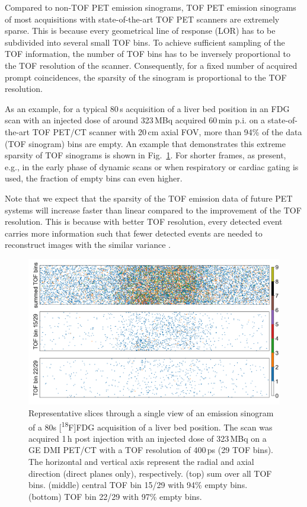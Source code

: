 Compared to non-TOF PET emission sinograms, TOF PET emission sinograms of most acquisitions
with state-of-the-art TOF PET scanners are extremely sparse.
This is because every geometrical line of response (LOR) has to be subdivided into
several small TOF bins.
To achieve sufficient sampling of the TOF information, the number of TOF bins has to be
inversely proportional to the TOF resolution of the scanner. 
Consequently, for a fixed number of acquired prompt coincidences, the sparsity of the
sinogram is proportional to the TOF resolution.

As an example, for a typical 80\,s acquisition of a liver bed position in an FDG scan with 
an injected dose of around 323\,MBq acquired 60\,min p.i. on a state-of-the-art TOF PET/CT scanner with
20\,cm axial FOV, more than 94\% of the data (TOF sinogram) bins are empty.
An example that demonstrates this extreme sparsity of TOF sinograms is shown in Fig.~\ref{fig:sparsity}.
For shorter frames, as present, e.g., in the early phase of dynamic scans or when respiratory
or cardiac gating is used, the fraction of empty bins can even higher.

Note that we expect that the sparsity of the TOF emission data of future PET systems will increase 
faster than linear compared to the improvement of the TOF resolution.
This is because with better TOF resolution, every detected event carries more information such
that fewer detected events are needed to reconstruct images with the similar 
variance \cite{Tomitani1981}.

\begin{figure}
  \centering
    \includegraphics[width=1.0\columnwidth]{./figs/sparsity.png}
  \caption{Representative slices through a single view of an emission sinogram of a 
  80s [\textsuperscript{18}F]FDG acquisition of a liver bed position. 
  The scan was acquired 1\,h post injection with an injected dose of 323\,MBq on
  a GE DMI PET/CT with a TOF resolution of 400\,ps (29 TOF bins). 
  The horizontal and vertical axis represent the radial and axial direction (direct planes only), 
  respectively. 
  (top) sum over all TOF bins. (middle) central TOF bin 15/29 with 94\% empty bins. 
  (bottom) TOF bin 22/29 with 97\% empty bins.}

  \label{fig:sparsity}
\end{figure}


